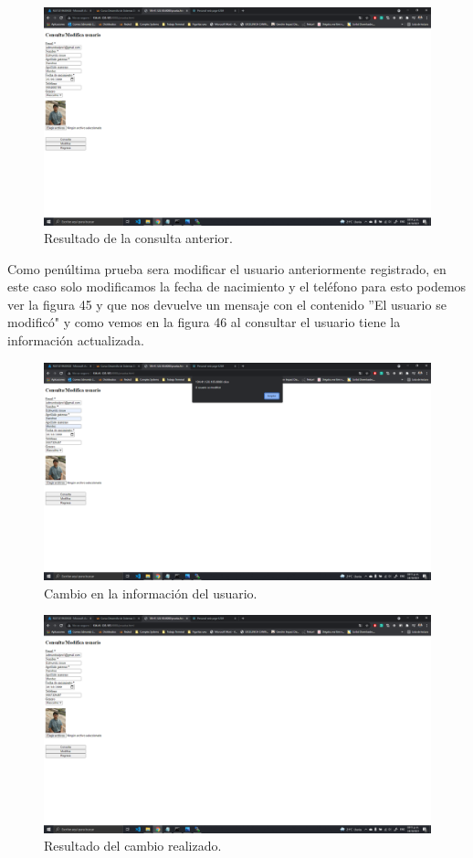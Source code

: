 \documentclass[11pt]{article}
\begin{document}
		\begin{figure}[H]
			\centering
			\includegraphics[scale=0.34]{resources/ULTIMO7.2.png}
			\caption{Resultado de la consulta anterior.}\label{fig:picture}
		\end{figure}
		Como penúltima prueba sera modificar el usuario anteriormente registrado, en este caso solo modificamos la fecha de nacimiento y el teléfono para esto podemos ver la figura 45 y que nos devuelve un mensaje con el contenido ''El usuario se modificó" y como vemos en la figura 46 al consultar el usuario tiene la información actualizada.
		\begin{figure}[H]
			\centering
			\includegraphics[scale=0.34]{resources/ULTIMO8.png}
			\caption{Cambio en la información del usuario.}\label{fig:picture}
		\end{figure}
		\begin{figure}[H]
			\centering
			\includegraphics[scale=0.34]{resources/ULTIMO9.png}
			\caption{Resultado del cambio realizado.}\label{fig:picture}
		\end{figure}
\end{document}

